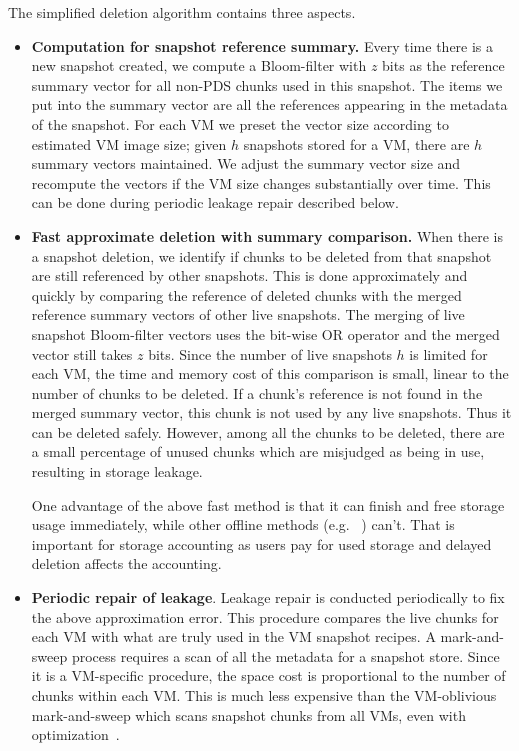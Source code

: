 The simplified deletion algorithm contains three aspects.
\begin{itemize}
\item {\bf Computation for snapshot reference summary.}
Every time there is a new snapshot created,
we compute a Bloom-filter with $z$ bits as the reference summary vector for all non-PDS chunks used 
in this snapshot.
The items we put into the summary vector are all the references appearing in the metadata of the snapshot.
For each VM we preset the vector size according to estimated VM image size;
given $h$ snapshots stored for a VM, there are $h$ summary vectors maintained.
We adjust the summary vector size and recompute the vectors if the VM size changes substantially over time.
This can be done during periodic leakage repair described below.

\item {\bf Fast approximate deletion with summary comparison.}
When there is a snapshot deletion,  
we identify if chunks to be deleted from that snapshot
are still referenced by other snapshots. 
This is done approximately and quickly by comparing the 
reference of deleted chunks  with
the merged reference summary vectors of other live snapshots.
The merging of live snapshot Bloom-filter vectors uses the bit-wise OR operator 
and the merged vector still takes $z$ bits.
Since the number of live snapshots $h$ is limited for
each VM, 
the time and memory cost of this comparison is small, linear to the number of chunks to be deleted.
If a chunk's reference is not found in the merged summary vector, 
this chunk is not used by any live snapshots. Thus it can be deleted safely.
However, among all the chunks to be deleted, 
there are a small percentage of unused chunks  which
are misjudged as  being in use, resulting in storage leakage.

One advantage of the above fast method is that it can finish  and free storage 
usage immediately, while other offline methods (e.g. ~\cite{Guo2011,Fabiano2013})
can't. That is important for storage accounting as users pay for used storage and delayed deletion
affects the accounting.

\item {\bf Periodic repair of leakage}.
Leakage repair is conducted periodically to fix the above approximation error.
This procedure compares the live chunks for each VM with what are truly used in the VM snapshot recipes.
A mark-and-sweep process  requires a scan of all the metadata for a snapshot store.
Since it is a VM-specific procedure, 
the space cost is proportional to the number of chunks
within each VM. 
 This is  much less expensive  than  the VM-oblivious mark-and-sweep
which scans snapshot chunks from all VMs, even with optimization~\cite{Guo2011}.


\end{itemize}
